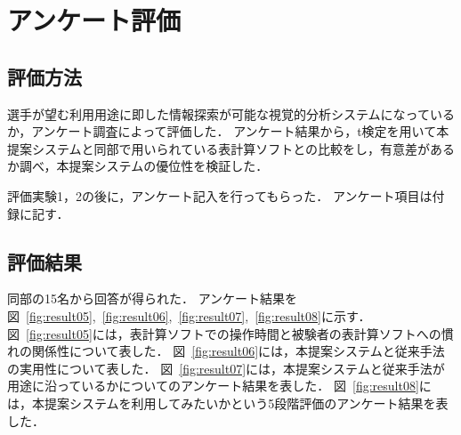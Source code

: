 \documentclass[sotsuron]{kuee}
\begin{document}
	\section{アンケート評価}
		\subsection{評価方法}
			選手が望む利用用途に即した情報探索が可能な視覚的分析システムになっているか，アンケート調査によって評価した．
			アンケート結果から，t検定を用いて本提案システムと同部で用いられている表計算ソフトとの比較をし，有意差があるか調べ，本提案システムの優位性を検証した．
			
			評価実験1，2の後に，アンケート記入を行ってもらった．
			アンケート項目は付録に記す．
		\subsection{評価結果}
			同部の15名から回答が得られた．
			アンケート結果を図~\ref{fig:result05},~\ref{fig:result06},~\ref{fig:result07},~\ref{fig:result08}に示す．
			図~\ref{fig:result05}には，表計算ソフトでの操作時間と被験者の表計算ソフトへの慣れの関係性について表した．
			図~\ref{fig:result06}には，本提案システムと従来手法の実用性について表した．
			図~\ref{fig:result07}には，本提案システムと従来手法が用途に沿っているかについてのアンケート結果を表した．
			図~\ref{fig:result08}には，本提案システムを利用してみたいかという5段階評価のアンケート結果を表した．
			
\end{document}
